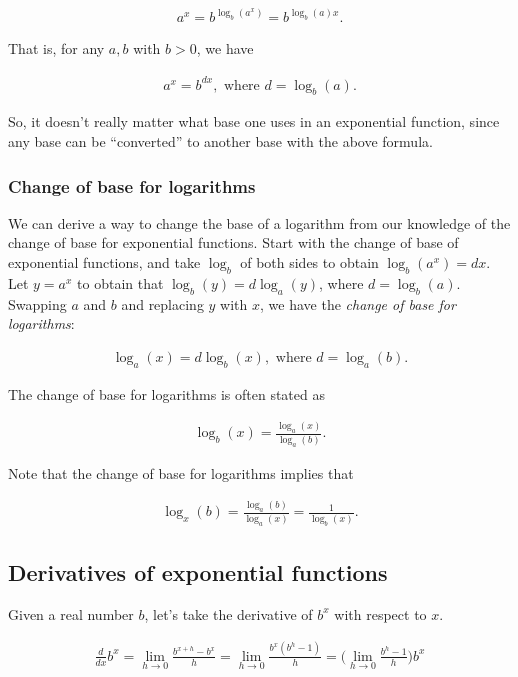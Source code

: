 \documentclass{article}
\begin{document}
\begin{align*}
    a^x = b^{\log_b(a^x)} = b^{\log_b(a) x}.
\end{align*}

That is, for any $a, b$ with $b > 0$, we have

\begin{align*}
    a^x = b^{dx}, \text{ where $d = \log_b(a)$}.
\end{align*}

So, it doesn't really matter what base one uses in an exponential function, since any base can be ``converted'' to another base with the above formula.

\subsubsection*{Change of base for logarithms}

We can derive a way to change the base of a logarithm from our knowledge of the change of base for exponential functions. Start with the change of base of exponential functions, and take $\log_b$ of both sides to obtain $\log_b(a^x) = dx$. Let $y = a^x$ to obtain that ${\log_b(y) = d\log_a(y)}$, where $d = \log_b(a)$. Swapping $a$ and $b$ and replacing $y$ with $x$, we have the \textit{change of base for logarithms}:

\begin{align*}
    \log_a(x) = d\log_b(x), \text{ where $d = \log_a(b)$}.
\end{align*}

The change of base for logarithms is often stated as

\begin{align*}
    \log_b(x) = \frac{\log_a(x)}{\log_a(b)}.
\end{align*}

Note that the change of base for logarithms implies that

\begin{align*}
    \log_x(b) = \frac{\log_a(b)}{\log_a(x)} = \frac{1}{\log_b(x)}.
\end{align*}

\subsection*{Derivatives of exponential functions}

Given a real number $b$, let's take the derivative of $b^x$ with respect to $x$.

\begin{align*}
    \frac{d}{dx} b^x = \lim_{h \rightarrow 0} \frac{b^{x + h} - b^x}{h}
    = \lim_{h \rightarrow 0} \frac{b^x (b^h - 1)}{h}
    = \Big( \lim_{h \rightarrow 0} \frac{b^h - 1}{h} \Big) b^x
\end{align*}
\end{document}
